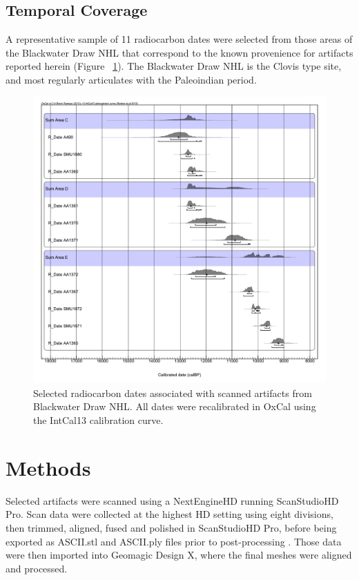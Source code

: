 \documentclass[preprint,12pt]{elsarticle}
\begin{document}
\subsection{Temporal Coverage} 

A representative sample of 11 radiocarbon dates were selected from those areas of the Blackwater Draw NHL that correspond to the known provenience for artifacts reported herein \cite{RN4612, RN4606, RN4607, RN4609} (Figure ~\ref{fig:BWD1}). The Blackwater Draw NHL is the Clovis type site, and most regularly articulates with the Paleoindian period. 

\begin{figure}[ht]\centering
\includegraphics[width=\linewidth]{BWD1}
\caption{Selected radiocarbon dates associated with scanned artifacts from Blackwater Draw NHL. All dates were recalibrated in OxCal \citep{RN308} using the IntCal13 \citep{RN4611} calibration curve.}
\label{fig:BWD1}
\end{figure}


\section{Methods}

Selected artifacts were scanned using a NextEngineHD running ScanStudioHD Pro. Scan data were collected at the highest HD setting using eight divisions, then trimmed, aligned, fused and polished in ScanStudioHD Pro, before being exported as ASCII.stl and ASCII.ply files prior to post-processing \cite{Galeazzi:1,Weyrich:1}. Those data were then imported into Geomagic Design X, where the final meshes were aligned and processed.
\end{document}
